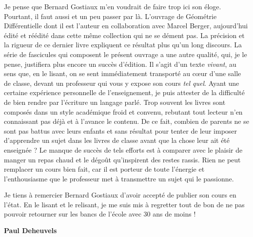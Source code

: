 Je pense que Bernard Gostiaux m'en voudrait de faire trop ici son éloge. Pourtant, il faut aussi et un peu passer par là. L'ouvrage de Géométrie Différentielle dont il est l'auteur en collaboration avec Marcel Berger, aujourd'hui édité et réédité dans cette même collection  qui ne se dément pas. La précision et la rigueur de ce dernier livre expliquent ce résultat plus qu'un long discours. La série de fascicules qui composent le présent ouvrage a une autre qualité, qui, je le pense, justifiera plus encore un succès d'édition. Il s'agit d'un texte \emph{vivant}, au sens que, en le lisant, on se sent immédiatement transporté au cœur d'une salle de classe, devant un professeur qui vous y expose son cours \emph{tel quel}. Ayant une certaine expérience personnelle de l'enseignement, je puis attester de la difficulté de bien rendre par l'écriture un langage parlé. Trop souvent les livres sont composés dans un style académique froid et convenu, rebutant tout lecteur n'en connaissant pas déjà et à l'avance le contenu. De ce fait, combien de parents ne se sont pas battus avec leurs enfants et sans résultat pour tenter de leur imposer d'apprendre un sujet dans les livres de classe avant que la chose leur ait été enseignée ? Le manque de succès de tels efforts est à comparer avec le plaisir de manger un repas chaud et le dégoût qu'inspirent des restes rassis. Rien ne peut remplacer un cours bien fait, car il est porteur de toute l'énergie et l'enthousiasme que le professeur met à transmettre un sujet qui le passionne.

Je tiens à remercier Bernard Gostiaux d'avoir accepté de publier son cours en l'état. En le lisant et le relisant, je me suis mis à regretter tout de bon de ne pas pouvoir retourner sur les bancs de l'école avec 30 ans de moins !

\begin{flushright}\bfseries Paul Deheuvels\end{flushright}
\clearpage
